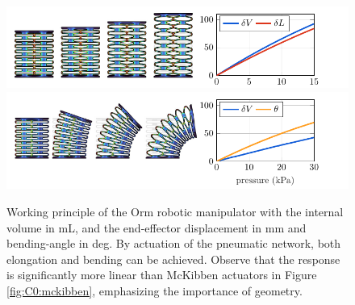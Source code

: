 \begin{figure}[!t]
  \centering
  \vspace{-3mm}
  \includegraphics{./pdf/thesis-figurex-2-4-1.pdf}
  \includegraphics{./pdf/thesis-figurex-2-4-2.pdf}
  \vspace{-7mm}
  \caption{Working principle of the Orm robotic manipulator \cite{BibEntryOrm2019Sep} with the internal volume  in \si{\milli \liter}, and the end-effector displacement  in \si{\milli \meter} and bending-angle  in deg. By actuation of the pneumatic network, both elongation and bending can be achieved. Observe that the response is significantly more linear than McKibben actuators in Figure \ref{fig:C0:mckibben}, emphasizing the importance of geometry.
  \label{fig:C0:ormrobot}}
  \vspace{-4mm}
\end{figure}

